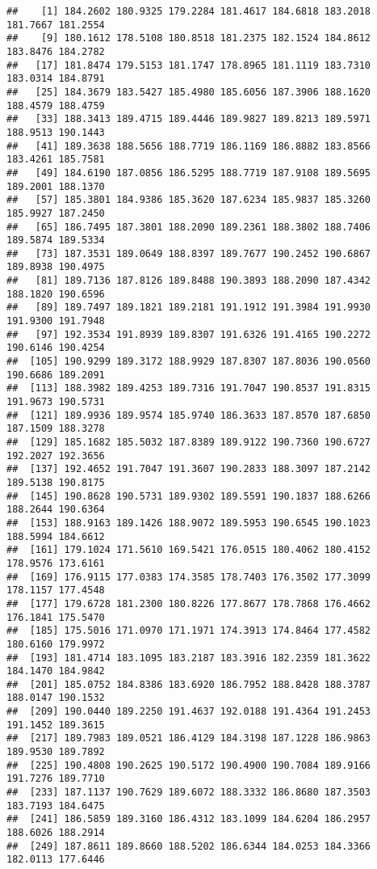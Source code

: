 \documentclass[
]{article}
\begin{document}
\begin{verbatim}
##    [1] 184.2602 180.9325 179.2284 181.4617 184.6818 183.2018 181.7667 181.2554
##    [9] 180.1612 178.5108 180.8518 181.2375 182.1524 184.8612 183.8476 184.2782
##   [17] 181.8474 179.5153 181.1747 178.8965 181.1119 183.7310 183.0314 184.8791
##   [25] 184.3679 183.5427 185.4980 185.6056 187.3906 188.1620 188.4579 188.4759
##   [33] 188.3413 189.4715 189.4446 189.9827 189.8213 189.5971 188.9513 190.1443
##   [41] 189.3638 188.5656 188.7719 186.1169 186.8882 183.8566 183.4261 185.7581
##   [49] 184.6190 187.0856 186.5295 188.7719 187.9108 189.5695 189.2001 188.1370
##   [57] 185.3801 184.9386 185.3620 187.6234 185.9837 185.3260 185.9927 187.2450
##   [65] 186.7495 187.3801 188.2090 189.2361 188.3802 188.7406 189.5874 189.5334
##   [73] 187.3531 189.0649 188.8397 189.7677 190.2452 190.6867 189.8938 190.4975
##   [81] 189.7136 187.8126 189.8488 190.3893 188.2090 187.4342 188.1820 190.6596
##   [89] 189.7497 189.1821 189.2181 191.1912 191.3984 191.9930 191.9300 191.7948
##   [97] 192.3534 191.8939 189.8307 191.6326 191.4165 190.2272 190.6146 190.4254
##  [105] 190.9299 189.3172 188.9929 187.8307 187.8036 190.0560 190.6686 189.2091
##  [113] 188.3982 189.4253 189.7316 191.7047 190.8537 191.8315 191.9673 190.5731
##  [121] 189.9936 189.9574 185.9740 186.3633 187.8570 187.6850 187.1509 188.3278
##  [129] 185.1682 185.5032 187.8389 189.9122 190.7360 190.6727 192.2027 192.3656
##  [137] 192.4652 191.7047 191.3607 190.2833 188.3097 187.2142 189.5138 190.8175
##  [145] 190.8628 190.5731 189.9302 189.5591 190.1837 188.6266 188.2644 190.6364
##  [153] 188.9163 189.1426 188.9072 189.5953 190.6545 190.1023 188.5994 184.6612
##  [161] 179.1024 171.5610 169.5421 176.0515 180.4062 180.4152 178.9576 173.6161
##  [169] 176.9115 177.0383 174.3585 178.7403 176.3502 177.3099 178.1157 177.4548
##  [177] 179.6728 181.2300 180.8226 177.8677 178.7868 176.4662 176.1841 175.5470
##  [185] 175.5016 171.0970 171.1971 174.3913 174.8464 177.4582 180.6160 179.9972
##  [193] 181.4714 183.1095 183.2187 183.3916 182.2359 181.3622 184.1470 184.9842
##  [201] 185.0752 184.8386 183.6920 186.7952 188.8428 188.3787 188.0147 190.1532
##  [209] 190.0440 189.2250 191.4637 192.0188 191.4364 191.2453 191.1452 189.3615
##  [217] 189.7983 189.0521 186.4129 184.3198 187.1228 186.9863 189.9530 189.7892
##  [225] 190.4808 190.2625 190.5172 190.4900 190.7084 189.9166 191.7276 189.7710
##  [233] 187.1137 190.7629 189.6072 188.3332 186.8680 187.3503 183.7193 184.6475
##  [241] 186.5859 189.3160 186.4312 183.1099 184.6204 186.2957 188.6026 188.2914
##  [249] 187.8611 189.8660 188.5202 186.6344 184.0253 184.3366 182.0113 177.6446

\end{verbatim}
\end{document}
